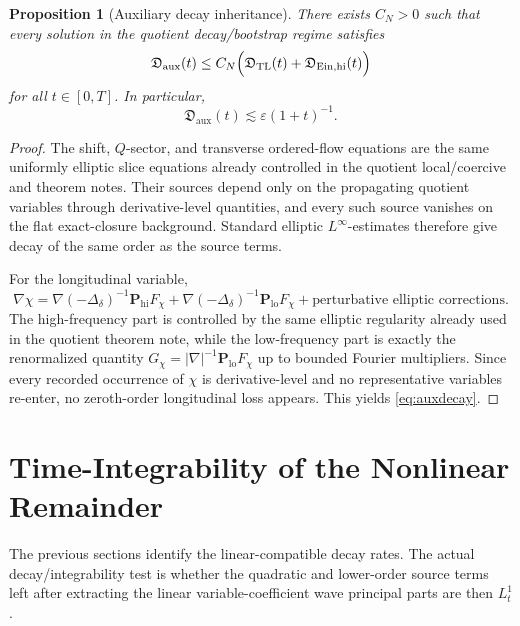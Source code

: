 \documentclass[11pt]{article}
\newtheorem{proposition}{Proposition}
\begin{document}
\begin{proposition}[Auxiliary decay inheritance]
\label{prop:auxdecay}
There exists \(C_N>0\) such that every solution in the quotient decay/bootstrap regime satisfies
\begin{equation}
\mathfrak D_{\mathrm{aux}}(t)
\le
C_N\Bigl(
\mathfrak D_{\mathrm{TL}}(t)
+ \mathfrak D_{\mathrm{Ein,hi}}(t)
\Bigr)
\label{eq:auxdecay}
\end{equation}
for all \(t\in[0,T]\). In particular,
\begin{equation}
\mathfrak D_{\mathrm{aux}}(t)\lesssim \varepsilon(1+t)^{-1}.
\label{eq:auxrate}
\end{equation}
\end{proposition}

\begin{proof}
The shift, \(Q\)-sector, and transverse ordered-flow equations are the same uniformly elliptic slice equations already controlled in the quotient local/coercive and theorem notes. Their sources depend only on the propagating quotient variables through derivative-level quantities, and every such source vanishes on the flat exact-closure background. Standard elliptic \(L^\infty\)-estimates therefore give decay of the same order as the source terms.

For the longitudinal variable,
\[
\nabla\chi
=
\nabla(-\Delta_\delta)^{-1}\mathbf P_{\mathrm{hi}}F_\chi
+\nabla(-\Delta_\delta)^{-1}\mathbf P_{\mathrm{lo}}F_\chi
+\text{perturbative elliptic corrections}.
\]
The high-frequency part is controlled by the same elliptic regularity already used in the quotient theorem note, while the low-frequency part is exactly the renormalized quantity \(G_\chi=|\nabla|^{-1}\mathbf P_{\mathrm{lo}}F_\chi\) up to bounded Fourier multipliers. Since every recorded occurrence of \(\chi\) is derivative-level and no representative variables re-enter, no zeroth-order longitudinal loss appears. This yields \eqref{eq:auxdecay}.
\end{proof}

\section{Time-Integrability of the Nonlinear Remainder}

The previous sections identify the linear-compatible decay rates. The actual decay/integrability test is whether the quadratic and lower-order source terms left after extracting the linear variable-coefficient wave principal parts are then \(L_t^1\).
\end{document}
